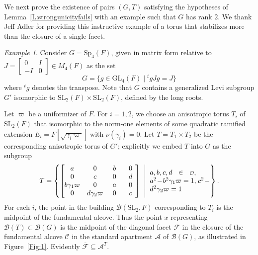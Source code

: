 \documentclass[12pt]{amsart}
\newcommand{\R}{{\scriptstyle{\mathcal{O}}}}
\newcommand{\ratk}{F}
\newcommand{\extk}{E}
\newcommand{\p}{\varpi}
\newcommand{\SL}{\mathrm{SL}}
\newcommand{\Sp}{\mathrm{Sp}}
\newcommand{\GL}{\mathrm{GL}}
\newcommand{\apart}{{\mathcal{A}}}
\newcommand{\buil}{\mathcal{B}}
\newcommand{\C}{\mathcal{C}} %
\newcommand{\F}{\mathcal{F}} %
\newcommand{\bmat}[1]{\begin{bmatrix} #1 \end{bmatrix}}
\theoremstyle{plain}
\theoremstyle{definition}
\theoremstyle{remark}
\newtheorem{egr}[theorem]{Example}
\newenvironment{example}{\begin{egr}}{\qedsymbol \end{egr}}
\numberwithin{equation}{section}
\numberwithin{figure}{section}
\begin{document}
We next prove the existence of pairs $(G,T)$ satisfying the hypotheses of Lemma~\ref{L:strongunicityfails} with an example such that $G$ has rank $2$.  We thank Jeff Adler for providing this instructive example of a torus that stabilizes more than the closure of a single facet.

\begin{example}\label{Ex:1}
Consider $G=\Sp_4(\ratk)$, given in matrix form relative to $J=\left[\begin{smallmatrix}0&I\\-I&0\end{smallmatrix}\right]\in M_4(\ratk)$ 
as the set
$$
G = \{ g \in \GL_4(\ratk)\mid {}^tgJg=J\}
$$
where ${}^tg$ denotes the transpose.  Note that $G$ contains a generalized Levi subgroup $G'$ isomorphic to $\SL_2(\ratk)\times \SL_2(\ratk)$, defined by the long roots.

Let $\p$ be a uniformizer of $\ratk$.  For $i=1,2$, we choose an anisotropic torus $T_i$ of $\mathrm{SL}_2(\ratk)$ that isomorphic to the norm-one elements of some quadratic ramified extension $\extk_i=\ratk[\sqrt{\gamma_i\p}]$ with $\nu(\gamma_i)=0$.  Let $T=T_1\times T_2$ be the corresponding anisotropic torus of $G'$; explicitly we embed $T$ into $G$ as the subgroup
$$
T=\left\{ 
\bmat{a &0 &\phantom{b}b\phantom{b}&\phantom{b}0\phantom{b}\\ %
0&c&0&d\\ 
b\gamma_1\p &0&a&0\\ 0&d\gamma_2\p & 0& c}
\;\; \middle| \;\;\parbox{1.2in}{$a,b,c,d \in \R, \quad\quad$ %
$a^2-b^2\gamma_1\p = 1$, $c^2-d^2\gamma_2\p=1$}\right\}.
$$
For each $i$, the point in the building $\buil(\SL_2,\ratk)$ corresponding to $T_i$ is the midpoint of the fundamental alcove.  Thus the point $x$ representing $\buil(T)\subset \buil(G)$ is the midpoint of the diagonal facet $\F$ in the closure of the fundamental alcove $\C$ in the standard apartment $\apart$ of $\buil(G)$, as illustrated in Figure~\ref{Fig:1}.  Evidently $\overline{\F} \subseteq \apart^T$.

\begin{figure}[ht]
\end{figure}
\end{example}
\end{document}
